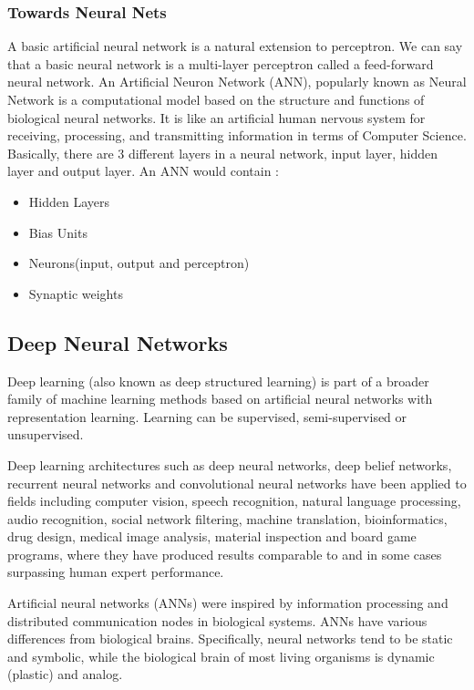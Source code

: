 		\subsubsection{Towards Neural Nets}
A basic artificial neural network is a natural extension to perceptron. We can say that a basic neural network is a multi-layer perceptron called a feed-forward neural network.  An Artificial Neuron Network (ANN), popularly known as Neural Network is a computational model based on the structure and functions of biological neural networks. It is like an artificial human nervous system for receiving, processing, and transmitting information in terms of Computer Science. Basically, there are 3 different layers in a neural network, input layer, hidden layer and output layer. An ANN would contain :
		\begin{itemize}
			\item Hidden Layers
			\item Bias Units
			\item Neurons(input, output and perceptron)
			\item Synaptic weights
		\end{itemize}

	\subsection{Deep Neural Networks}
	Deep learning (also known as deep structured learning) is part of a broader family of machine learning methods based on artificial neural networks with representation learning. Learning can be supervised, semi-supervised or unsupervised.	\cite{bengio2013representation,schmidhuber2015deep}

Deep learning architectures such as deep neural networks, deep belief networks, recurrent neural networks and convolutional neural networks have been applied to fields including computer vision, speech recognition, natural language processing, audio recognition, social network filtering, machine translation, bioinformatics, drug design, medical image analysis, material inspection and board game programs, where they have produced results comparable to and in some cases surpassing human expert performance.\cite{krizhevsky2012imagenet}

Artificial neural networks (ANNs) were inspired by information processing and distributed communication nodes in biological systems. ANNs have various differences from biological brains. Specifically, neural networks tend to be static and symbolic, while the biological brain of most living organisms is dynamic (plastic) and analog.

